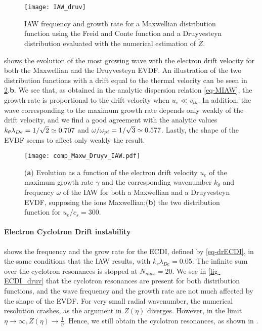   \begin{figure}[!hbt]
    \centering
    \texttt{[image: IAW\_druv]}
    \caption{IAW frequency and growth rate for a Maxwellian distribution function using the Freid and Conte function and a Druyvesteyn distribution evaluated with the numerical estimation of $\tilde{Z}$. }
    \label{fig-IAW_druv}
  \end{figure}
   shows the evolution of the most growing wave with the electron drift velocity for both the Maxwellian and the Druyvesteyn \ac{EVDF}.
  An illustration of the two distribution functions with a drift equal to the thermal velocity can be seen in \cref{fig-valition-solver}.{\bf b}.
  We see that, as obtained in the analytic dispersion relation \cref{eq-MIAW}, the growth rate is proportional to the drift velocity when $u_e \ll v_{th}$.
  In addition, the wave corresponding to the maximum growth rate depends only weakly of the drift velocity, and we find a good agreement with the analytic values $k_{\theta} \lambda_{De} =1/\sqrt{2} \simeq 0.707$ and $\omega / \omega_{pi} = 1/\sqrt{3} \simeq 0.577$. 
  Lastly, the shape of the \ac{EVDF} seems to affect only weakly the result.
  
  \begin{figure}[!hbt]
    \centering
    \texttt{[image: comp\_Maxw\_Druyv\_IAW.pdf]}
    \caption{({\bf a}) Evolution as a function of the electron drift velocity $u_e$ of the maximum growth rate $\gamma$ and the corresponding wavenumber $k_{\theta}$ and frequency $\omega$ of the \acs{IAW} for both a Maxwellian and a Druyvesteyn \acs{EVDF}, supposing the ions Maxwellian;({\bf b}) the two distribution function for $u_e/c_s = 300$.}
    \label{fig-valition-solver}
  \end{figure}
  
  \FloatBarrier
  
  \paragraph{Electron Cyclotron Drift instability\\}
    

  
   shows the frequency and the grow rate for the \ac{ECDI}, defined by \cref{eq-drECDI}, in the same conditions that the \ac{IAW} results, with $k_r \lambda_{De} = 0.05 $.
  The infinite sum over the cyclotron resonances is stopped at $N_{max} = 20$.
  We see in \cref{fig-ECDI_druv} that the cyclotron resonances are present for both distribution functions, and the wave frequency and the growth rate are not much affected by the shape of the \ac{EVDF}.
  For very small radial wavenumber, the numerical resolution crashes, as the argument in $Z(\eta)$ diverges.
  However, in the limit $\eta \rightarrow \infty, Z(\eta) \rightarrow  \frac{1}{\eta}$.
  Hence, we still obtain the cyclotron resonances, as shown in \citet[Fig. 2]{janhunen2018}.
  
